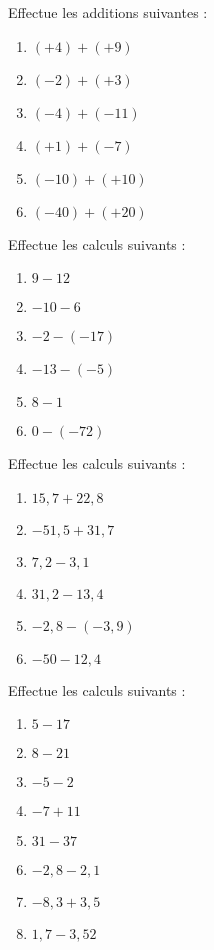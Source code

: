 


\begin{exercice}Effectue les additions suivantes :
\begin{enumerate}
\item $(+4) +(+9)$
\item $(-2) +(+3)$
\item $(-4) +(-11)$
\item $(+1) +(-7)$
\item $(-10) +(+10)$
\item $(-40) +(+20)$
\end{enumerate}
\end{exercice}


\begin{exercice}Effectue les calculs suivants :
\begin{enumerate}
\item $9 -12$
\item $-10 -6$
\item $-2 - (-17)$
\item $-13 - (-5)$
\item $8 -1$
\item $0 -(-72)$
\end{enumerate}
\end{exercice}


\begin{exercice}Effectue les calculs suivants :
\begin{enumerate}
\item $15,7 +22,8$
\item $-51,5 +31,7$
\item $7,2 -3,1$
\item $31,2 -13,4$
\item $-2,8	- (-3,9)$
\item $-50	-12,4$
\end{enumerate}
\end{exercice}


\begin{exercice}Effectue les calculs suivants :
\begin{enumerate}
\item $5 -17$
\item $8 -21$
\item $-5 -2$
\item $-7 +11$
\item $31 -37$
\item $-2,8 -2,1$
\item $-8,3 +3,5$
\item $1,7 -3,52$
\end{enumerate}
\end{exercice}


